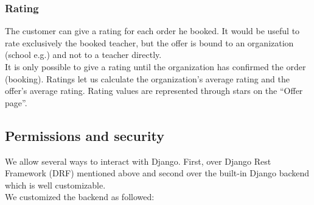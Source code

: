 \documentclass[11pt]{article} %
\begin{document}
\subsubsection{Rating}
The customer can give a rating for each order he booked. It would be useful to rate exclusively the booked teacher, but the offer is bound to an organization (school e.g.) and not to a teacher directly.\\
It is only possible to give a rating until the organization has confirmed the order (booking). Ratings let us calculate the organization's average rating and the offer's average rating. Rating values are represented through stars on the “Offer page”.
\newpage

\subsection{Permissions and security}
We allow several ways to interact with Django. First, over Django Rest Framework (DRF) mentioned above and second over the built-in Django backend which is well customizable.\\
We customized the backend as followed:\\
\end{document}

